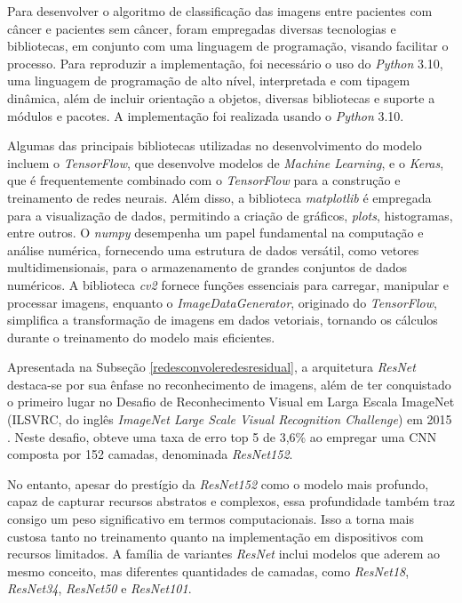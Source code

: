 Para desenvolver o algoritmo de classificação das imagens entre pacientes com câncer e pacientes sem câncer, foram empregadas diversas tecnologias e bibliotecas, em conjunto com uma linguagem de programação, visando facilitar o processo. Para reproduzir a implementação, foi necessário o uso do \textit{Python} 3.10, uma linguagem de programação de alto nível, interpretada e com tipagem dinâmica, além de incluir orientação a objetos, diversas bibliotecas e suporte a módulos e pacotes. A implementação foi realizada usando o \textit{Python} 3.10. 






Algumas das principais bibliotecas utilizadas no desenvolvimento do modelo incluem o \textit{TensorFlow}, que desenvolve modelos de \textit{Machine Learning}, e o \textit{Keras}, que é frequentemente combinado com o \textit{TensorFlow} para a construção e treinamento de redes neurais. Além disso, a biblioteca \textit{matplotlib} é empregada para a visualização de dados, permitindo a criação de gráficos, \textit{plots}, histogramas, entre outros. O \textit{numpy} desempenha um papel fundamental na computação e análise numérica, fornecendo uma estrutura de dados versátil, como vetores multidimensionais, para o armazenamento de grandes conjuntos de dados numéricos. A biblioteca \textit{cv2} fornece funções essenciais para carregar, manipular e processar imagens, enquanto o \textit{ImageDataGenerator}, originado do \textit{TensorFlow}, simplifica a transformação de imagens em dados vetoriais, tornando os cálculos durante o treinamento do modelo mais eficientes.


Apresentada na Subseção \ref{redesconvoleredesresidual}, a arquitetura \textit{ResNet} destaca-se por sua ênfase no reconhecimento de imagens, além de ter conquistado o primeiro lugar no Desafio de Reconhecimento Visual em Larga Escala ImageNet (ILSVRC, do inglês \textit{ImageNet Large Scale Visual Recognition Challenge}) em 2015 \cite{resnet50analisys}. Neste desafio, obteve uma taxa de erro top 5 de 3,6\% ao empregar uma CNN composta por 152 camadas, denominada \textit{ResNet152}.

No entanto, apesar do prestígio da \textit{ResNet152} como o modelo mais profundo, capaz de capturar recursos abstratos e complexos, essa profundidade também traz consigo um peso significativo em termos computacionais. Isso a torna mais custosa tanto no treinamento quanto na implementação em dispositivos com recursos limitados. A família de variantes \textit{ResNet} inclui modelos que aderem ao mesmo conceito, mas diferentes quantidades de camadas, como \textit{ResNet18}, \textit{ResNet34}, \textit{ResNet50} e \textit{ResNet101}. 

